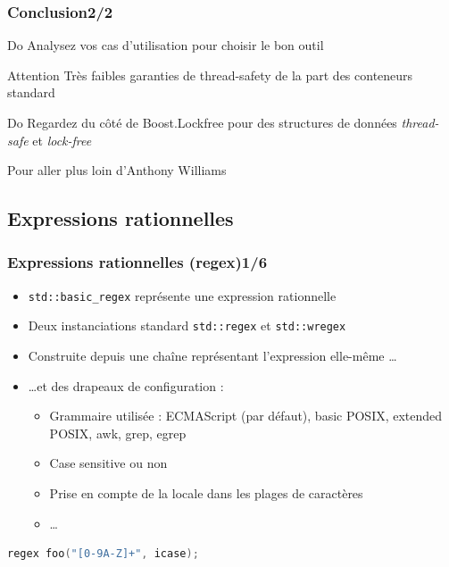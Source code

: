 \documentclass[C++.tex]{subfiles}
\begin{document}
\begin{frame}[fragile]
	\frametitle{Conclusion\titlehfill{}2/2}
	\begin{exampleblock}{Do}
		Analysez vos cas d'utilisation pour choisir le bon outil
	\end{exampleblock}

	\begin{alertblock}{Attention}
		Très faibles garanties de thread-safety de la part des conteneurs standard

	\end{alertblock}

	\begin{exampleblock}{Do}
		Regardez du côté de Boost.Lockfree pour des structures de données \textit{thread-safe} et \textit{lock-free}
	\end{exampleblock}

	\begin{block}{Pour aller plus loin}
		\cite{ConcInAction} d'Anthony Williams

	\end{block}
\end{frame}

\subsection*{Expressions rationnelles}
\begin{frame}[fragile]
	\frametitle{Expressions rationnelles (regex)\titlehfill{}1/6}
	\begin{itemize}
		\item \lstinline|std::basic_regex| représente une expression rationnelle
		\item Deux instanciations standard \lstinline|std::regex| et \lstinline|std::wregex|
		\item Construite depuis une chaîne représentant l'expression elle-même \ldots
		\item \ldots{}et des drapeaux de configuration :
		\begin{itemize}
			\item Grammaire utilisée : ECMAScript (par défaut), basic POSIX, extended POSIX, awk, grep, egrep
			\item Case sensitive ou non
			\item Prise en compte de la locale dans les plages de caractères
			\item \ldots
		\end{itemize}
	\end{itemize}

	\begin{lstlisting}[language=C++]
regex foo("[0-9A-Z]+", icase);\end{lstlisting}
\end{frame}
\end{document}

